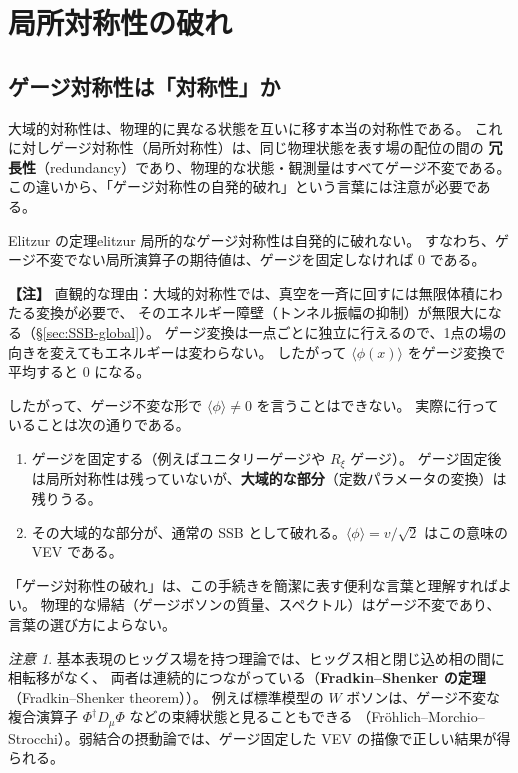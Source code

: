 \documentclass[uplatex,dvipdfmx,a4paper,11pt,openany]{jsbook}
\newcommand{\term}[2]{\textbf{#1}（#2）}
\newenvironment{note}{\vspace{1ex}\par\footnotesize\noindent\textbf{【注】}}{\par\vspace{1ex}}
\numberwithin{equation}{chapter}
\theoremstyle{definition}
\theoremstyle{plain}
\theoremstyle{remark}
\newtheorem{remark}{注意}[chapter]
\begin{document}
\section{局所対称性の破れ}
\label{sec:local-breaking}
\subsection{ゲージ対称性は「対称性」か}
大域的対称性は、物理的に異なる状態を互いに移す本当の対称性である。
これに対しゲージ対称性（局所対称性）は、同じ物理状態を表す場の配位の間の
\term{冗長性}{redundancy}であり、物理的な状態・観測量はすべてゲージ不変である。
この違いから、「ゲージ対称性の自発的破れ」という言葉には注意が必要である。
\begin{mythm}{Elitzur の定理}{elitzur}
局所的なゲージ対称性は自発的に破れない。
すなわち、ゲージ不変でない局所演算子の期待値は、ゲージを固定しなければ 0 である。
\end{mythm}
\begin{note}
直観的な理由：大域的対称性では、真空を一斉に回すには無限体積にわたる変換が必要で、
そのエネルギー障壁（トンネル振幅の抑制）が無限大になる（\S\ref{sec:SSB-global}）。
ゲージ変換は一点ごとに独立に行えるので、1点の場の向きを変えてもエネルギーは変わらない。
したがって $\langle\phi(x)\rangle$ をゲージ変換で平均すると 0 になる。
\end{note}
したがって、ゲージ不変な形で $\langle\phi\rangle\ne0$ を言うことはできない。
実際に行っていることは次の通りである。
\begin{enumerate}
    \item ゲージを固定する（例えばユニタリーゲージや $R_\xi$ ゲージ）。
    ゲージ固定後は局所対称性は残っていないが、\textbf{大域的な部分}（定数パラメータの変換）は残りうる。
    \item その大域的な部分が、通常の SSB として破れる。$\langle\phi\rangle=v/\sqrt2$ はこの意味の VEV である。
\end{enumerate}
「ゲージ対称性の破れ」は、この手続きを簡潔に表す便利な言葉と理解すればよい。
物理的な帰結（ゲージボソンの質量、スペクトル）はゲージ不変であり、言葉の選び方によらない。
\begin{remark}
基本表現のヒッグス場を持つ理論では、ヒッグス相と閉じ込め相の間に相転移がなく、
両者は連続的につながっている（\term{Fradkin--Shenker の定理}{Fradkin--Shenker theorem}）。
例えば標準模型の $W$ ボソンは、ゲージ不変な複合演算子 $\Phi^\dagger D_\mu\Phi$ などの束縛状態と見ることもできる
（Fr\"ohlich--Morchio--Strocchi）。弱結合の摂動論では、ゲージ固定した VEV の描像で正しい結果が得られる。
\end{remark}
\end{document}
